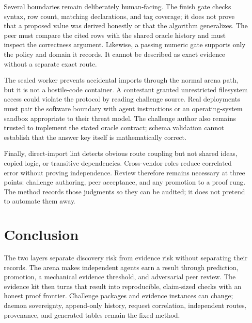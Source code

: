 \documentclass[11pt]{article}
\begin{document}
Several boundaries remain deliberately human-facing.  The finish gate checks
syntax, row count, matching declarations, and tag coverage; it does not prove
that a proposed value was derived honestly or that the algorithm generalizes.
The peer must compare the cited rows with the shared oracle history and must
inspect the correctness argument.  Likewise, a passing numeric gate supports
only the policy and domain it records.  It cannot be described as exact
evidence without a separate exact route.

The sealed worker prevents accidental imports through the normal arena path,
but it is not a hostile-code container.  A contestant granted unrestricted
filesystem access could violate the protocol by reading challenge source.
Real deployments must pair the software boundary with agent instructions or
an operating-system sandbox appropriate to their threat model.  The
challenge author also remains trusted to implement the stated oracle
contract; schema validation cannot establish that the answer key itself is
mathematically correct.

Finally, direct-import lint detects obvious route coupling but not shared
ideas, copied logic, or transitive dependencies.  Cross-vendor roles reduce
correlated error without proving independence.  Review therefore remains
necessary at three points: challenge authoring, peer acceptance, and any
promotion to a proof rung.  The method records those judgments so they can be
audited; it does not pretend to automate them away.

\section{Conclusion}

The two layers separate discovery risk from evidence risk without separating
their records.  The arena makes independent agents earn a result through
prediction, promotion, a mechanical evidence threshold, and adversarial peer
review.  The evidence kit then turns that result into reproducible,
claim-sized checks with an honest proof frontier.  Challenge packages and
evidence instances can change; daemon sovereignty, append-only history,
request correlation, independent routes, provenance, and generated tables
remain the fixed method.
\end{document}
